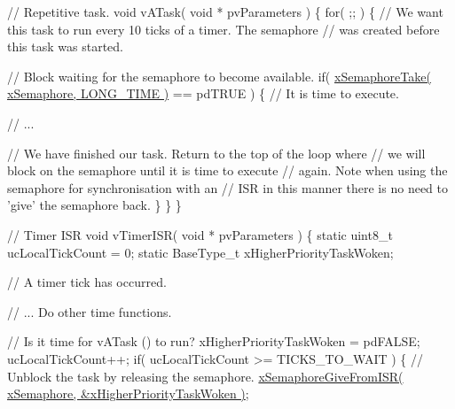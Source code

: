 \begin{DoxyPre}  // Repetitive task.
  void vATask( void * pvParameters )
  \{
   for( ;; )
   \{
       // We want this task to run every 10 ticks of a timer.  The semaphore
       // was created before this task was started.\end{DoxyPre}



\begin{DoxyPre}       // Block waiting for the semaphore to become available.
       if( \hyperlink{vendor_2ceedling_2plugins_2freertos_2src_2freertos_2include_2semphr_8h_af116e436d2a5ae5bd72dbade2b5ea930}{xSemaphoreTake( xSemaphore, LONG\_TIME )} == pdTRUE )
       \{
           // It is time to execute.\end{DoxyPre}



\begin{DoxyPre}           // ...\end{DoxyPre}



\begin{DoxyPre}           // We have finished our task.  Return to the top of the loop where
           // we will block on the semaphore until it is time to execute
           // again.  Note when using the semaphore for synchronisation with an
           // ISR in this manner there is no need to 'give' the semaphore back.
       \}
   \}
  \}\end{DoxyPre}



\begin{DoxyPre}  // Timer ISR
  void vTimerISR( void * pvParameters )
  \{
  static uint8\_t ucLocalTickCount = 0;
  static BaseType\_t xHigherPriorityTaskWoken;\end{DoxyPre}



\begin{DoxyPre}   // A timer tick has occurred.\end{DoxyPre}



\begin{DoxyPre}   // ... Do other time functions.\end{DoxyPre}



\begin{DoxyPre}   // Is it time for vATask () to run?
   xHigherPriorityTaskWoken = pdFALSE;
   ucLocalTickCount++;
   if( ucLocalTickCount >= TICKS\_TO\_WAIT )
   \{
       // Unblock the task by releasing the semaphore.
       \hyperlink{vendor_2ceedling_2plugins_2freertos_2src_2freertos_2include_2semphr_8h_a68aa43df8b2a0dbe17d05fad74670ef0}{xSemaphoreGiveFromISR( xSemaphore, &xHigherPriorityTaskWoken )};\end{DoxyPre}



